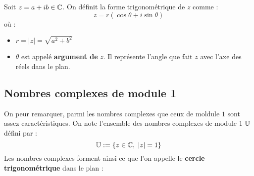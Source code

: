 \begin{definition}
    Soit $z = a + ib \in \mathbb{C}$. On définit la forme trigonométrique de $z$ comme : 
        \[ z = r (\cos \theta + i \sin \theta) \] 
    où : 

    \begin{minipage}{0.45\textwidth}
        \begin{itemize}
            \item $ r = | z | = \sqrt{a^2 + b^2} $ 
            \item $\theta$ est appelé \textbf{argument de }$z$. Il représente l'angle que fait $z$ 
            avec l'axe des réels dans le plan. 
        \end{itemize}
    \end{minipage}
    \hfill
    \begin{minipage}{0.45\textwidth}
        \begin{center}
        \end{center}
    \end{minipage}
\end{definition}

\subsection{Nombres complexes de module 1}

On peur remarquer, parmi les nombres complexes que ceux de moldule $1$ sont assez caractéristiques. 
On note l'ensemble des nombres complexes de module 1 $\mathbb{U}$ défini par : 
    \[ \mathbb{U} := \{z \in \mathbb{C},  \; | z | = 1 \} \] 
Les nombres complexes forment ainsi ce que l'on appelle le \textbf{cercle trigonométrique} dans le plan : 

